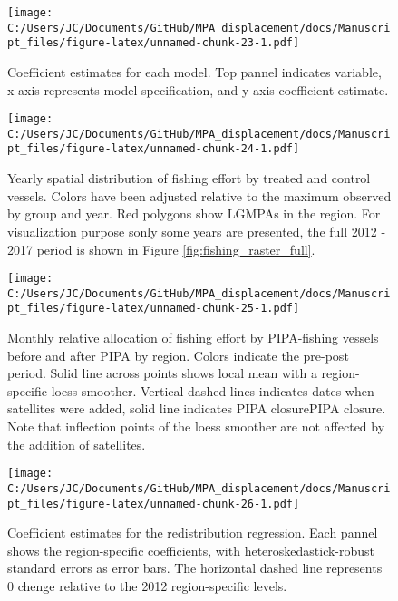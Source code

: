 \documentclass[11pt,]{article}
\begin{document}
\begin{figure}
\centering
\texttt{[image: C:/Users/JC/Documents/GitHub/MPA\_displacement/docs/Manuscript\_files/figure-latex/unnamed-chunk-23-1.pdf]}
\caption{\label{fig:unnamed-chunk-23}\label{fig:long}Coefficient estimates
for each model. Top pannel indicates variable, x-axis represents model
specification, and y-axis coefficient estimate.}
\end{figure}

\begin{figure}
\centering
\texttt{[image: C:/Users/JC/Documents/GitHub/MPA\_displacement/docs/Manuscript\_files/figure-latex/unnamed-chunk-24-1.pdf]}
\caption{\label{fig:unnamed-chunk-24}\label{fig:fishing_raster}Yearly
spatial distribution of fishing effort by treated and control vessels.
Colors have been adjusted relative to the maximum observed by group and
year. Red polygons show LGMPAs in the region. For visualization purpose
sonly some years are presented, the full 2012 - 2017 period is shown in
Figure \ref{fig:fishing_raster_full}.}
\end{figure}

\begin{figure}
\centering
\texttt{[image: C:/Users/JC/Documents/GitHub/MPA\_displacement/docs/Manuscript\_files/figure-latex/unnamed-chunk-25-1.pdf]}
\caption{\label{fig:unnamed-chunk-25}\label{fig:redist_trend}Monthly
relative allocation of fishing effort by PIPA-fishing vessels before and
after PIPA by region. Colors indicate the pre-post period. Solid line
across points shows local mean with a region-specific loess smoother.
Vertical dashed lines indicates dates when satellites were added, solid
line indicates PIPA closurePIPA closure. Note that inflection points of
the loess smoother are not affected by the addition of satellites.}
\end{figure}

\begin{figure}
\centering
\texttt{[image: C:/Users/JC/Documents/GitHub/MPA\_displacement/docs/Manuscript\_files/figure-latex/unnamed-chunk-26-1.pdf]}
\caption{\label{fig:unnamed-chunk-26}\label{fig:mean_change}Coefficient
estimates for the redistribution regression. Each pannel shows the
region-specific coefficients, with heteroskedastick-robust standard
errors as error bars. The horizontal dashed line represents 0 chenge
relative to the 2012 region-specific levels.}
\end{figure}
\end{document}

